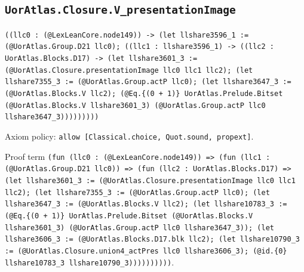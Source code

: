 \documentclass[11pt]{article}
\begin{document}
\subsection*{\texttt{UorAtlas.Closure.V\_presentationImage}}
\noindent\texttt{((llc0 : (@LexLeanCore.node149)) -> (let llshare3596\_1 := (@UorAtlas.Group.D21 llc0); ((llc1 : llshare3596\_1) -> ((llc2 : UorAtlas.Blocks.D17) -> (let llshare3601\_3 := (@UorAtlas.Closure.presentationImage llc0 llc1 llc2); (let llshare7355\_3 := (@UorAtlas.Group.actP llc0); (let llshare3647\_3 := (@UorAtlas.Blocks.V llc2); (@Eq.\{(0 + 1)\} UorAtlas.Prelude.Bitset (@UorAtlas.Blocks.V llshare3601\_3) (@UorAtlas.Group.actP llc0 llshare3647\_3)))))))))}\par
\noindent Axiom policy: \texttt{allow [Classical.choice, Quot.sound, propext]}.\par
\noindent Proof term \texttt{(fun (llc0 : (@LexLeanCore.node149)) => (fun (llc1 : (@UorAtlas.Group.D21 llc0)) => (fun (llc2 : UorAtlas.Blocks.D17) => (let llshare3601\_3 := (@UorAtlas.Closure.presentationImage llc0 llc1 llc2); (let llshare7355\_3 := (@UorAtlas.Group.actP llc0); (let llshare3647\_3 := (@UorAtlas.Blocks.V llc2); (let llshare10783\_3 := (@Eq.\{(0 + 1)\} UorAtlas.Prelude.Bitset (@UorAtlas.Blocks.V llshare3601\_3) (@UorAtlas.Group.actP llc0 llshare3647\_3)); (let llshare3606\_3 := (@UorAtlas.Blocks.D17.blk llc2); (let llshare10790\_3 := (@UorAtlas.Closure.union4\_actPres llc0 llshare3606\_3); (@id.\{0\} llshare10783\_3 llshare10790\_3))))))))))}.\par
\end{document}
